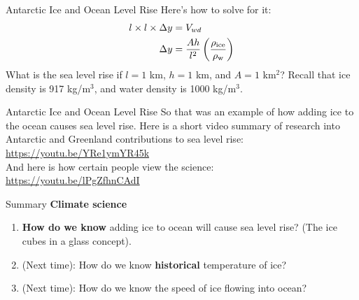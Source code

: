 \documentclass{beamer}
\begin{document}
\begin{frame}{Antarctic Ice and Ocean Level Rise}
Here's how to solve for it:
\begin{align}
l \times l \times \Delta y &= V_{wd} \\
\Delta y &= \frac{Ah}{l^2}\left(\frac{\rho_{\rm ice}}{\rho_{\rm w}}\right)
\end{align}
What is the sea level rise if $l = 1$ km, $h = 1$ km, and $A = 1$ km$^2$?  Recall that ice density is 917 kg/m$^3$, and water density is 1000 kg/m$^3$.
\end{frame}

\begin{frame}{Antarctic Ice and Ocean Level Rise}
So that was an example of how adding ice to the ocean causes sea level rise.  Here is a short video summary of research into Antarctic and Greenland contributions to sea level rise: \\ 
\url{https://youtu.be/YRe1ymYR45k} \\ \vspace{1cm}
And here is how certain people view the science: \\
\url{https://youtu.be/lPgZfhnCAdI}
\end{frame}

\begin{frame}{Summary}
\textbf{Climate science}
\begin{enumerate}
\item \textbf{How do we know} adding ice to ocean will cause sea level rise? (The ice cubes in a glass concept).
\item (Next time): How do we know \textbf{historical} temperature of ice?
\item (Next time): How do we know the speed of ice flowing into ocean?
\end{enumerate}
\end{frame}
\end{document}
